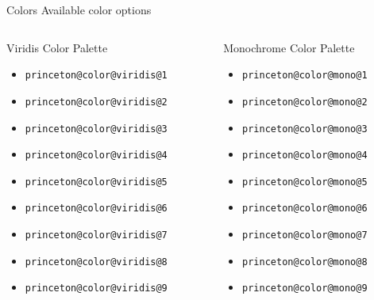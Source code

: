 \documentclass[aspectratio=169]{beamer}
\begin{document}
\begin{frame}[t]{Colors }{Available color options}
\begin{columns}[T]
    \begin{column}{.33\textwidth}
      \begin{block}{Viridis Color Palette}
        \begin{itemize}
        \item \textcolor{princeton@color@viridis@1}{\texttt{princeton@color@viridis@1}}
        \item \textcolor{princeton@color@viridis@2}{\texttt{princeton@color@viridis@2}}
        \item \textcolor{princeton@color@viridis@3}{\texttt{princeton@color@viridis@3}}
        \item \textcolor{princeton@color@viridis@4}{\texttt{princeton@color@viridis@4}}
        \item \textcolor{princeton@color@viridis@5}{\texttt{princeton@color@viridis@5}}
        \item \textcolor{princeton@color@viridis@6}{\texttt{princeton@color@viridis@6}}
        \item \textcolor{princeton@color@viridis@7}{\texttt{princeton@color@viridis@7}}
        \item \textcolor{princeton@color@viridis@8}{\texttt{princeton@color@viridis@8}}
        \item \textcolor{princeton@color@viridis@9}{\texttt{princeton@color@viridis@9}}
        \end{itemize}
      \end{block}
    \end{column}

    \begin{column}{.33\textwidth}
      \begin{block}{Monochrome Color Palette}
        \begin{itemize}
        \item \textcolor{princeton@color@mono@1}{\texttt{princeton@color@mono@1}}
        \item \textcolor{princeton@color@mono@2}{\texttt{princeton@color@mono@2}}
        \item \textcolor{princeton@color@mono@3}{\texttt{princeton@color@mono@3}}
        \item \textcolor{princeton@color@mono@4}{\texttt{princeton@color@mono@4}}
        \item \textcolor{princeton@color@mono@5}{\texttt{princeton@color@mono@5}}
        \item \textcolor{princeton@color@mono@6}{\texttt{princeton@color@mono@6}}
        \item \textcolor{princeton@color@mono@7}{\texttt{princeton@color@mono@7}}
        \item \textcolor{princeton@color@mono@8}{\texttt{princeton@color@mono@8}}
        \item \textcolor{princeton@color@mono@9}{\texttt{princeton@color@mono@9}}
        \end{itemize}
      \end{block}
    \end{column}
  \end{columns}

\end{frame}
\end{document}
